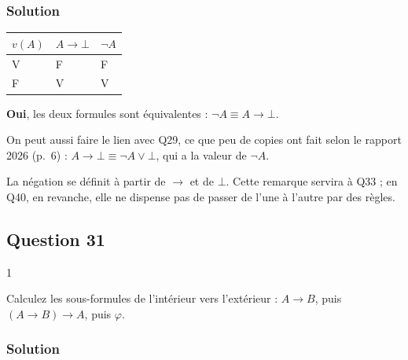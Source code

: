 \documentclass[11pt,a4paper]{article}
\begin{document}
\hypertarget{solution-29}{%
\subsubsection{Solution}\label{solution-29}}

\begin{longtable}[]{@{}lll@{}}
\toprule\noalign{}
\(v(A)\) & \(A \to \bot\) & \(\neg A\) \\
\midrule\noalign{}
\endhead
\bottomrule\noalign{}
\endlastfoot
V & F & F \\
F & V & V \\
\end{longtable}

\textbf{Oui}, les deux formules sont équivalentes : \(\boxed{\neg A \equiv A \to \bot}\).

On peut aussi faire le lien avec Q29, ce que peu de copies ont fait selon le rapport 2026 (p.~6) : \(A \to \bot \equiv \neg A \vee \bot\), qui a la valeur de \(\neg A\).

\begin{methode}

La négation se définit à partir de \(\to\) et de \(\bot\). Cette remarque servira à Q33 ; en Q40, en revanche, elle ne dispense pas de passer de l'une à l'autre par des règles.

\end{methode}

\hypertarget{question-31}{%
\subsection{Question 31}\label{question-31}}

\begin{indication}{1}

Calculez les sous-formules de l'intérieur vers l'extérieur : \(A \to B\), puis \((A \to B) \to A\), puis \(\varphi\).

\end{indication}

\hypertarget{solution-30}{%
\subsubsection{Solution}\label{solution-30}}
\end{document}
